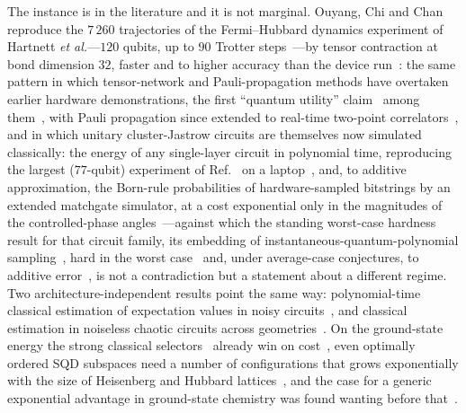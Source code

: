 The instance is in the literature and it is not marginal. Ouyang, Chi and Chan reproduce the $7\,260$
trajectories of the Fermi--Hubbard dynamics experiment of Hartnett \emph{et al.}---$120$ qubits, up to
$90$ Trotter steps~\cite{qctrlfh2026}---by tensor contraction at bond dimension $32$, faster and to
higher accuracy than the device run~\cite{ouyang2026}: the
same pattern in which tensor-network and Pauli-propagation methods have overtaken earlier hardware
demonstrations, the first ``quantum utility'' claim~\cite{kim2023} among
them~\cite{tindall2024,begusic2024}, with Pauli propagation since extended to real-time two-point
correlators~\cite{kemper2026}, and in which unitary cluster-Jastrow circuits are themselves now
simulated classically: the energy of any single-layer circuit in polynomial time, reproducing the
largest ($77$-qubit) experiment of Ref.~\cite{robledomoreno2025} on a laptop~\cite{belagali2026}, and, to additive approximation, the Born-rule probabilities of
hardware-sampled bitstrings by an extended matchgate simulator, at a cost exponential only in the
magnitudes of the controlled-phase angles~\cite{extraferm}---against which the standing worst-case hardness result for
that circuit family, its embedding of instantaneous-quantum-polynomial
sampling~\cite{hafid2025}, hard in the worst case~\cite{bremner2011} and, under average-case
conjectures, to additive error~\cite{bremner2016}, is not a contradiction but a statement about a different
regime. Two architecture-independent results point
the same way: polynomial-time classical estimation of expectation values in noisy
circuits~\cite{schuster2025}, and classical estimation in noiseless chaotic circuits across
geometries~\cite{angrisani2025}. On the ground-state energy the strong classical
selectors~\cite{holmeshci2016,sharmashci2017,tubmanasci2016} already win on
cost~\cite{reinholdt2025,zhangotten2026}, even optimally ordered SQD subspaces need a number of
configurations that grows exponentially with the size of Heisenberg and Hubbard
lattices~\cite{gaberle2026}, and the case for a generic exponential advantage
in ground-state chemistry was found wanting before that~\cite{leechan2023}.

